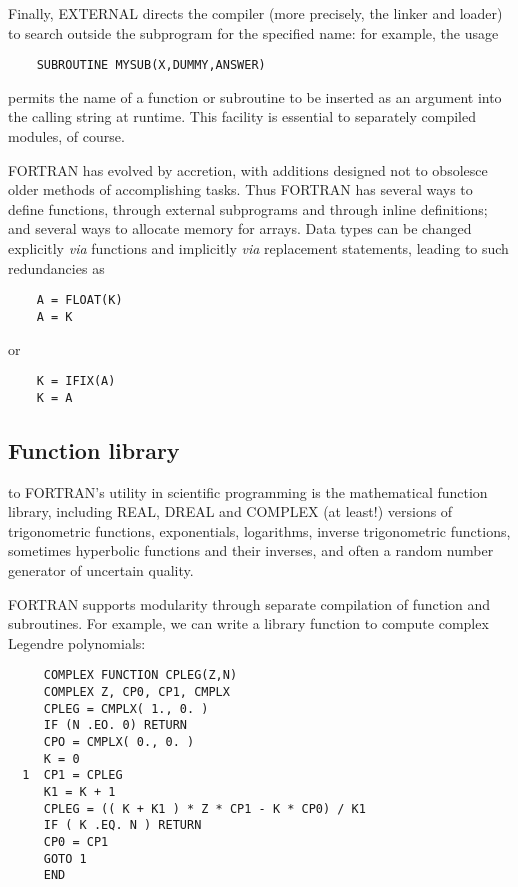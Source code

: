 Finally, EXTERNAL directs the compiler (more precisely, the linker and loader) to search outside the subprogram for the specified name: for example, the usage

\begin{verbatim}
    SUBROUTINE MYSUB(X,DUMMY,ANSWER)
\end{verbatim}

permits the name of a function or subroutine to be inserted as an argument into the calling string at runtime. This facility is essential to separately compiled modules, of course.

 FORTRAN has evolved by accretion, with additions designed not to obsolesce older methods of accomplishing tasks. Thus FORTRAN has several ways to define functions, through external subprograms and through inline definitions; and several ways to allocate memory for arrays. Data types can be changed explicitly \textit{via} functions and implicitly \textit{via} replacement statements, leading to such redundancies as

\begin{verbatim}
    A = FLOAT(K) 
    A = K
\end{verbatim}
or
\begin{verbatim}
    K = IFIX(A)
    K = A
\end{verbatim}

\subsection{Function library}
 to FORTRAN's utility in scientific programming is the mathematical function library, including REAL, DREAL and COMPLEX (at least!) versions of trigonometric functions, exponentials, logarithms, inverse trigonometric functions, sometimes hyperbolic functions and their inverses, and often a random number generator of uncertain quality. 

FORTRAN supports modularity through separate compilation of function and subroutines. For example, we can write a library function to compute complex Legendre polynomials:

\begin{verbatim} 
     COMPLEX FUNCTION CPLEG(Z,N)
     COMPLEX Z, CP0, CP1, CMPLX
     CPLEG = CMPLX( 1., 0. ) 
     IF (N .EO. 0) RETURN
     CPO = CMPLX( 0., 0. )
     K = 0
  1  CP1 = CPLEG
     K1 = K + 1
     CPLEG = (( K + K1 ) * Z * CP1 - K * CP0) / K1
     IF ( K .EQ. N ) RETURN 
     CP0 = CP1
     GOTO 1 
     END
\end{verbatim}

